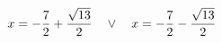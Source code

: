 \documentclass[preview]{standalone}
\begin{document}
\begin{align*}
\special{dvisvgm:raw <g id='unique000'>}x=- \frac{7}{2} + \frac{\sqrt{13}}{2} \quad \lor \quad x=- \frac{7}{2} - \frac{\sqrt{13}}{2}\special{dvisvgm:raw </g>}
\end{align*}
\end{document}
